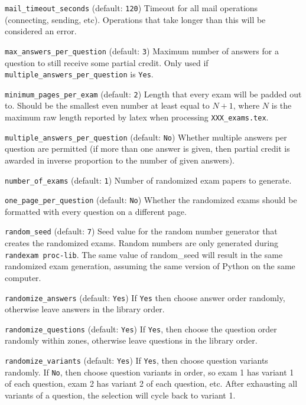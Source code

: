 \documentclass{article}
\begin{document}
\hangindent=1cm \texttt{mail_timeout_seconds} (default: \texttt{120})
Timeout for all mail operations (connecting, sending, etc).
Operations that take longer than this will be considered an error.

\hangindent=1cm \texttt{max_answers_per_question} (default:
\texttt{3}) Maximum number of answers for a question to still receive
some partial credit. Only used if
\texttt{multiple_answers_per_question} is \texttt{Yes}.

\hangindent=1cm \texttt{minimum_pages_per_exam} (default: \texttt{2})
Length that every exam will be padded out to. Should be the smallest
even number at least equal to $N + 1$, where $N$ is the maximum raw
length reported by latex when processing \texttt{XXX_exams.tex}.

\hangindent=1cm \texttt{multiple_answers_per_question} (default:
\texttt{No}) Whether multiple answers per question are permitted (if
more than one answer is given, then partial credit is awarded in
inverse proportion to the number of given answers).

\hangindent=1cm \texttt{number_of_exams} (default: \texttt{1}) Number
of randomized exam papers to generate.

\hangindent=1cm \texttt{one_page_per_question} (default: \texttt{No})
Whether the randomized exams should be formatted with every question
on a different page.

\hangindent=1cm \texttt{random_seed} (default: \texttt{7}) Seed value
for the random number generator that creates the randomized
exams. Random numbers are only generated during \texttt{randexam
  proc-lib}. The same value of random_seed will result in the same
randomized exam generation, assuming the same version of Python on the
same computer.

\hangindent=1cm \texttt{randomize_answers} (default: \texttt{Yes}) If
\texttt{Yes} then choose answer order randomly, otherwise leave
answers in the library order.

\hangindent=1cm \texttt{randomize_questions} (default: \texttt{Yes})
If \texttt{Yes}, then choose the question order randomly within zones,
otherwise leave questions in the library order.

\hangindent=1cm \texttt{randomize_variants} (default: \texttt{Yes}) If
\texttt{Yes}, then choose question variants randomly. If \texttt{No},
then choose question variants in order, so exam 1 has variant 1 of
each question, exam 2 has variant 2 of each question, etc. After
exhausting all variants of a question, the selection will cycle back
to variant 1.
\end{document}
